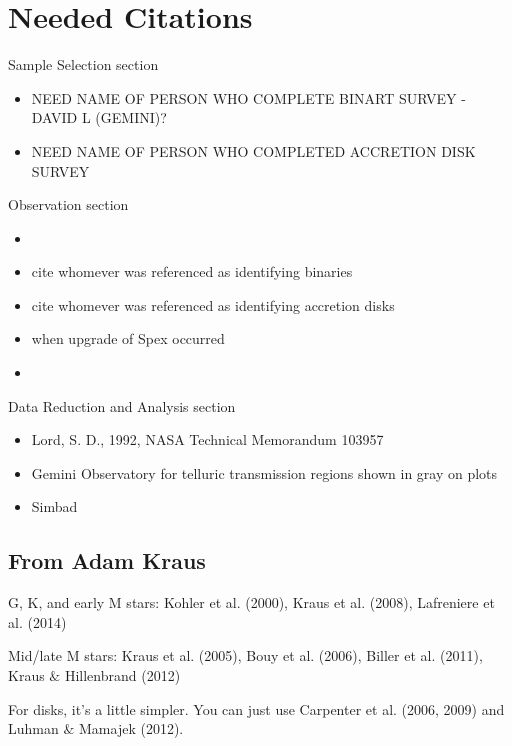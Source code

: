\section{Needed Citations}

\begin{bf}Sample Selection section\end{bf}
	\begin{itemize}
		\item{} NEED NAME OF PERSON WHO COMPLETE BINART SURVEY - DAVID L (GEMINI)?
		\item{} NEED NAME OF PERSON WHO COMPLETED ACCRETION DISK SURVEY
\end{itemize}

\begin{bf}Observation section\end{bf}
	\begin{itemize}
		\item{} \cite{Rayner_2003}
		\item{} cite whomever was referenced as identifying binaries \cite{Adam_Krauss_or_other_paper}
		\item{} cite whomever was referenced as identifying accretion disks \cite{Carpenter_2006}
		\item{} when upgrade of Spex occurred \cite{Spex}\\
		\item{} \cite{2mass_catalog_for_j_mags}
	\end{itemize} 


\begin{bf}Data Reduction and Analysis section\end{bf}
	\begin{itemize}
		\item{} Lord, S. D., 1992, NASA Technical Memorandum 103957
		\item{} Gemini Observatory for telluric transmission regions shown in gray on plots
  		\item{} Simbad
  
	\end{itemize}

\subsection{From Adam Kraus}
G, K, and early M stars: Kohler et al. (2000), Kraus et al. (2008), Lafreniere et al. (2014)

Mid/late M stars: Kraus et al. (2005), Bouy et al. (2006), Biller et al. (2011), Kraus $\&$ Hillenbrand (2012)

For disks, it's a little simpler. You can just use Carpenter et al. (2006, 2009) and Luhman $\&$ Mamajek (2012). 
